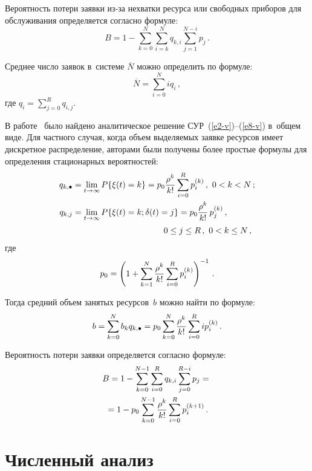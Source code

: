 \begin{multicols}{2}
  Вероятность потери заявки из-за нехватки ресурса или свободных приборов 
для обслуживания определяется согласно формуле:
  \begin{equation}
  B=1-\sum\limits_{k=0}^N \sum\limits_{i=k}^N q_{k,i} \sum\limits_{j=1}^{N-i} 
p_j\,.
  \label{e9-v}
  \end{equation}
  
  Среднее число заявок в~системе $\overline{N}$ можно определить по 
формуле:
  \begin{equation}
  \overline{N} = \sum\limits_{i=0}^N iq_i\,,
  \label{e10-v}
  \end{equation}
где $q_i= \sum\nolimits_{j=0}^R q_{i,j}$.

  В работе~\cite{3-v} было найдено аналитическое решение  
СУР~(\ref{e2-v})--(\ref{e8-v}) в~общем виде. Для частного случая, когда объем 
выделяемых заявке ресурсов имеет дискретное распределение, авторами были 
получены более простые формулы для определения стационарных 
вероятностей:
  \begin{align*}
  q_{k,\bullet} &=\lim\limits_{t\to\infty} P\{ \xi(t)=k\} = p_0
\fr{\rho^k}{k!}\sum\limits_{i=0}^R p_i^{(k)}\,,\ 0<k<N\,;\\
  q_{k,j} &=\lim\limits_{t\to\infty} P\{\xi(t)=k;\delta(t)=j\} = p_0 \fr{\rho^k}{k!}\, 
p_j^{(k)}\,,\\
& \hspace*{38mm}0\leq j\leq R\,,\ 0<k\leq N\,,
  \end{align*}
где 
$$
p_0 = \left( 1+\sum\limits_{k=1}^N \displaystyle\frac{\displaystyle \rho^k\mathstrut}{\displaystyle k!\mathstrut} \sum\limits_{i=0}^R 
p_i^{(k)}\right)^{-1}\,.
$$

  Тогда средний объем занятых ресурсов~$b$ можно найти по формуле:
  \begin{equation}
  b=\sum\limits_{k=0}^N b_k q_{k,\bullet} = p_0\sum\limits_{k=0}^N 
\displaystyle\frac{\displaystyle \rho^k\mathstrut}{\displaystyle k!\mathstrut} \sum\limits_{i=0}^R i p_i^{(k)}\,.
  \label{e11-v}
  \end{equation}
  
  Вероятность потери заявки определяется согласно формуле: 
  \begin{multline}
  B=1-\sum\limits_{k=0}^{N-1} \sum\limits_{i=0}^R q_{k,i} 
\sum\limits_{j=0}^{R-i} p_j={}\\
{}=1-p_0 \sum\limits_{k=0}^{N-1} \displaystyle\frac{\displaystyle \rho^k\mathstrut}{\displaystyle k!\mathstrut} 
\sum\limits_{i=0}^R p_i^{(k+1)}\,.
  \label{e12-v}
  \end{multline}

\section{Численный анализ}
    

\end{multicols}
